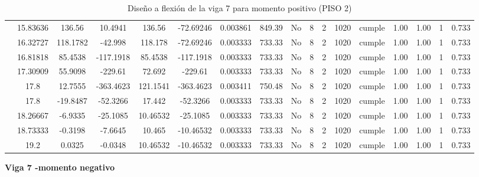 \begin{table}[H]
{\begin{tabular}{|c|c|c|c|c|c|c|c|c|c|c|c|c|c|c|c|c|}
\cline{2-17}        & 15.83636 & 136.56 & 10.4941 & 136.56 & -72.69246 & 0.003861 & 849.39 & No  & 8   & 2   & 1020 & \cellcolor[rgb]{ .776,  .937,  .808}cumple & 1.00 & 1.00 & 1   & 0.733 \bigstrut\\
\cline{2-17}        & 16.32727 & 118.1782 & -42.998 & 118.178 & -72.69246 & 0.003333 & 733.33 & No  & 8   & 2   & 1020 & \cellcolor[rgb]{ .776,  .937,  .808}cumple & 1.00 & 1.00 & 1   & 0.733 \bigstrut\\
\cline{2-17}        & 16.81818 & 85.4538 & -117.1918 & 85.4538 & -117.1918 & 0.003333 & 733.33 & No  & 8   & 2   & 1020 & \cellcolor[rgb]{ .776,  .937,  .808}cumple & 1.00 & 1.00 & 1   & 0.733 \bigstrut\\
\cline{2-17}        & 17.30909 & 55.9098 & -229.61 & 72.692 & -229.61 & 0.003333 & 733.33 & No  & 8   & 2   & 1020 & \cellcolor[rgb]{ .776,  .937,  .808}cumple & 1.00 & 1.00 & 1   & 0.733 \bigstrut\\
\cline{2-17}        & \cellcolor[rgb]{ .851,  .882,  .949}17.8 & 12.7555 & -363.4623 & 121.1541 & -363.4623 & 0.003411 & 750.48 & No  & 8   & 2   & 1020 & \cellcolor[rgb]{ .776,  .937,  .808}cumple & 1.00 & 1.00 & 1   & 0.733 \bigstrut\\
\cline{2-17}        & \cellcolor[rgb]{ .851,  .882,  .949}17.8 & -19.8487 & -52.3266 & 17.442 & -52.3266 & 0.003333 & 733.33 & No  & 8   & 2   & 1020 & \cellcolor[rgb]{ .776,  .937,  .808}cumple & 1.00 & 1.00 & 1   & 0.733 \bigstrut\\
\cline{2-17}        & 18.26667 & -6.9335 & -25.1085 & 10.46532 & -25.1085 & 0.003333 & 733.33 & No  & 8   & 2   & 1020 & \cellcolor[rgb]{ .776,  .937,  .808}cumple & 1.00 & 1.00 & 1   & 0.733 \bigstrut\\
\cline{2-17}        & 18.73333 & -0.3198 & -7.6645 & 10.465 & -10.46532 & 0.003333 & 733.33 & No  & 8   & 2   & 1020 & \cellcolor[rgb]{ .776,  .937,  .808}cumple & 1.00 & 1.00 & 1   & 0.733 \bigstrut\\
\cline{2-17}        & 19.2 & 0.0325 & -0.0348 & 10.46532 & -10.46532 & 0.003333 & 733.33 & No  & 8   & 2   & 1020 & \cellcolor[rgb]{ .776,  .937,  .808}cumple & 1.00 & 1.00 & 1   & 0.733 \bigstrut\\
    \hline
    \end{tabular}%
  
  
  
}%
    \caption{Diseño a flexión de la viga 7 para momento positivo (PISO 2) }
  \label{tab:F VG7 P2 M+}%
\end{table}%
\newpage
\textbf{Viga 7 -momento negativo}
